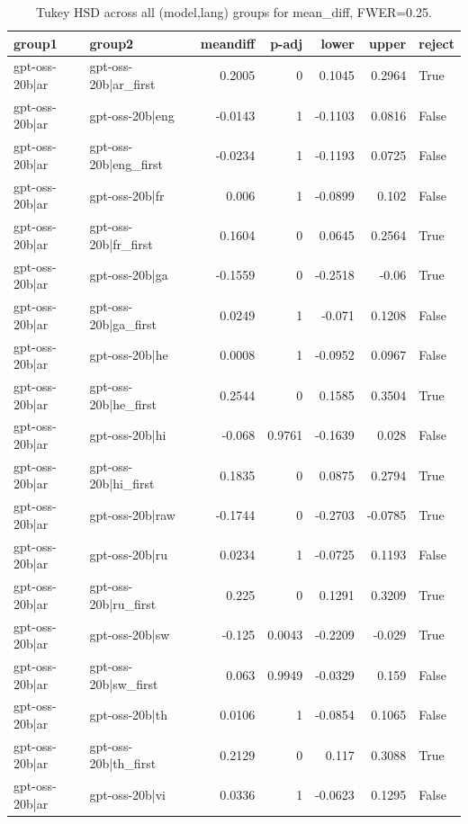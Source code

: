 \begin{table}
\caption{Tukey HSD across all (model,lang) groups for mean_diff, FWER=0.25.}
\label{tab:tukey_all_models_all_langs_mean_diff}
\begin{tabular}{l l r r r r l}
\toprule
group1 & group2 & meandiff & p-adj & lower & upper & reject \\
\midrule
gpt-oss-20b|ar & gpt-oss-20b|ar_first & 0.2005 & 0 & 0.1045 & 0.2964 & True \\
gpt-oss-20b|ar & gpt-oss-20b|eng & -0.0143 & 1 & -0.1103 & 0.0816 & False \\
gpt-oss-20b|ar & gpt-oss-20b|eng_first & -0.0234 & 1 & -0.1193 & 0.0725 & False \\
gpt-oss-20b|ar & gpt-oss-20b|fr & 0.006 & 1 & -0.0899 & 0.102 & False \\
gpt-oss-20b|ar & gpt-oss-20b|fr_first & 0.1604 & 0 & 0.0645 & 0.2564 & True \\
gpt-oss-20b|ar & gpt-oss-20b|ga & -0.1559 & 0 & -0.2518 & -0.06 & True \\
gpt-oss-20b|ar & gpt-oss-20b|ga_first & 0.0249 & 1 & -0.071 & 0.1208 & False \\
gpt-oss-20b|ar & gpt-oss-20b|he & 0.0008 & 1 & -0.0952 & 0.0967 & False \\
gpt-oss-20b|ar & gpt-oss-20b|he_first & 0.2544 & 0 & 0.1585 & 0.3504 & True \\
gpt-oss-20b|ar & gpt-oss-20b|hi & -0.068 & 0.9761 & -0.1639 & 0.028 & False \\
gpt-oss-20b|ar & gpt-oss-20b|hi_first & 0.1835 & 0 & 0.0875 & 0.2794 & True \\
gpt-oss-20b|ar & gpt-oss-20b|raw & -0.1744 & 0 & -0.2703 & -0.0785 & True \\
gpt-oss-20b|ar & gpt-oss-20b|ru & 0.0234 & 1 & -0.0725 & 0.1193 & False \\
gpt-oss-20b|ar & gpt-oss-20b|ru_first & 0.225 & 0 & 0.1291 & 0.3209 & True \\
gpt-oss-20b|ar & gpt-oss-20b|sw & -0.125 & 0.0043 & -0.2209 & -0.029 & True \\
gpt-oss-20b|ar & gpt-oss-20b|sw_first & 0.063 & 0.9949 & -0.0329 & 0.159 & False \\
gpt-oss-20b|ar & gpt-oss-20b|th & 0.0106 & 1 & -0.0854 & 0.1065 & False \\
gpt-oss-20b|ar & gpt-oss-20b|th_first & 0.2129 & 0 & 0.117 & 0.3088 & True \\
gpt-oss-20b|ar & gpt-oss-20b|vi & 0.0336 & 1 & -0.0623 & 0.1295 & False \\

\end{tabular}
\end{table}
